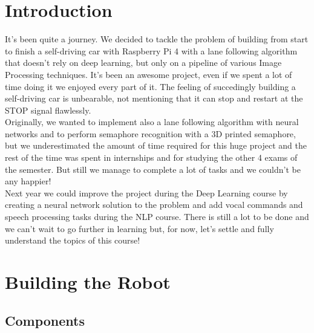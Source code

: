 \documentclass[12pt,a4paper]{article}
\begin{document}
\section{Introduction}
\begin{large}
It's been quite a journey. We decided to tackle the problem of building from start to finish a self-driving car with Raspberry Pi 4 with a lane following algorithm that doesn't rely on deep learning, but only on a pipeline of various Image Processing techniques. It's been an awesome project, even if we spent a lot of time doing it we enjoyed every part of it. The feeling of succedingly building a self-driving car is unbearable, not mentioning that it can stop and restart at the STOP signal flawlessly. \\
Originally, we wanted to implement also a lane following algorithm with neural networks and to perform semaphore recognition with a 3D printed semaphore, but we underestimated the amount of time required for this huge project and the rest of the time was spent in internships and for studying the other 4 exams of the semester. But still we manage to complete a lot of tasks and we couldn't be any happier! \\
Next year we could improve the project during the Deep Learning course by creating a neural network solution to the problem and add vocal commands and speech processing tasks during the NLP course. There is still a lot to be done and we can't wait to go further in learning but, for now, let's settle and fully understand the topics of this course!

\newpage
\section{Building the Robot}


\subsection{Components}


\end{large}
\end{document}

